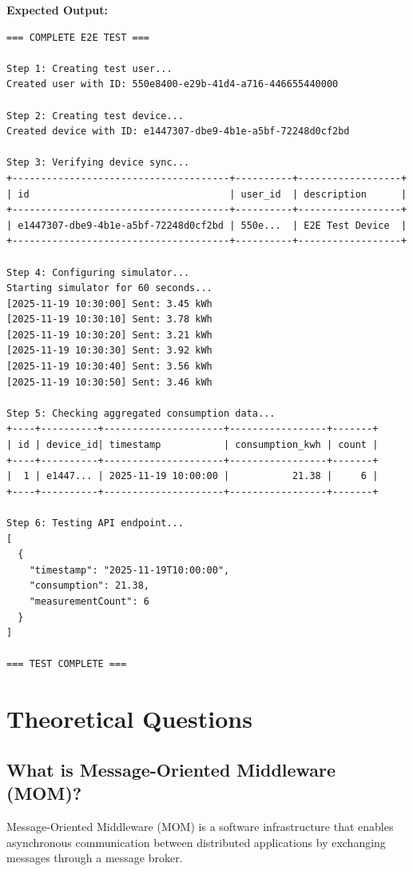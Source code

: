 \documentclass[12pt,a4paper]{article}
\begin{document}
\textbf{Expected Output:}

\begin{verbatim}
=== COMPLETE E2E TEST ===

Step 1: Creating test user...
Created user with ID: 550e8400-e29b-41d4-a716-446655440000

Step 2: Creating test device...
Created device with ID: e1447307-dbe9-4b1e-a5bf-72248d0cf2bd

Step 3: Verifying device sync...
+--------------------------------------+----------+------------------+
| id                                   | user_id  | description      |
+--------------------------------------+----------+------------------+
| e1447307-dbe9-4b1e-a5bf-72248d0cf2bd | 550e...  | E2E Test Device  |
+--------------------------------------+----------+------------------+

Step 4: Configuring simulator...
Starting simulator for 60 seconds...
[2025-11-19 10:30:00] Sent: 3.45 kWh
[2025-11-19 10:30:10] Sent: 3.78 kWh
[2025-11-19 10:30:20] Sent: 3.21 kWh
[2025-11-19 10:30:30] Sent: 3.92 kWh
[2025-11-19 10:30:40] Sent: 3.56 kWh
[2025-11-19 10:30:50] Sent: 3.46 kWh

Step 5: Checking aggregated consumption data...
+----+----------+---------------------+-----------------+-------+
| id | device_id| timestamp           | consumption_kwh | count |
+----+----------+---------------------+-----------------+-------+
|  1 | e1447... | 2025-11-19 10:00:00 |           21.38 |     6 |
+----+----------+---------------------+-----------------+-------+

Step 6: Testing API endpoint...
[
  {
    "timestamp": "2025-11-19T10:00:00",
    "consumption": 21.38,
    "measurementCount": 6
  }
]

=== TEST COMPLETE ===
\end{verbatim}

\newpage

\section{Theoretical Questions}

\subsection{What is Message-Oriented Middleware (MOM)?}

Message-Oriented Middleware (MOM) is a software infrastructure that enables asynchronous communication between distributed applications by exchanging messages through a message broker.
\end{document}
